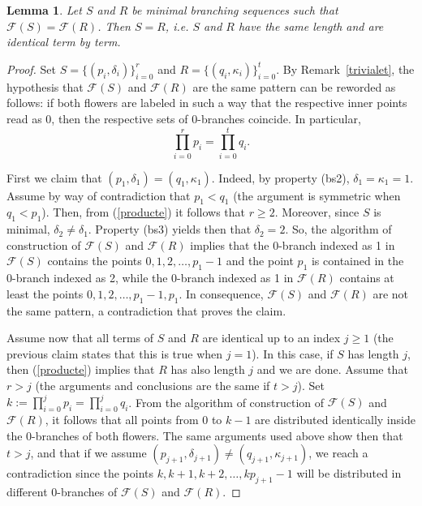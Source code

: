\documentclass[a4paper]{amsart}
\newtheorem{lemma}[theorem]{Lemma}
\theoremstyle{definition}
\begin{document}
\begin{lemma}\label{bra0}
Let $S$ and $R$ be minimal branching sequences such that $\mathcal{F}(S)=\mathcal{F}(R)$. Then $S=R$, i.e. $S$ and $R$ have the same length and are identical term by term.
\end{lemma}
\begin{proof}
Set $S=\{(p_i,\delta_i)\}_{i=0}^r$ and $R=\{(q_i,\kappa_i)\}_{i=0}^{t}$. By Remark~\ref{trivialet}, the hypothesis that $\mathcal{F}(S)$ and $\mathcal{F}(R)$ are the same pattern can be reworded as follows: if both flowers are labeled in such a way that the respective inner points read as 0, then the respective sets of 0-branches coincide. In particular,
\begin{equation}\label{producte}
\prod_{i=0}^r p_i=\prod_{i=0}^t q_i.
\end{equation}

First we claim that $(p_1,\delta_1)=(q_1,\kappa_1)$. Indeed, by property (bs2), $\delta_1=\kappa_1=1$. Assume by way of contradiction that $p_1<q_1$ (the argument is symmetric when $q_1<p_1$). Then, from (\ref{producte}) it follows that $r\ge2$. Moreover, since $S$ is minimal,  $\delta_2\ne\delta_1$. Property (bs3) yields then that $\delta_2=2$. So, the algorithm of construction of $\mathcal{F}(S)$ and $\mathcal{F}(R)$ implies that the 0-branch indexed as 1 in $\mathcal{F}(S)$ contains the points $0,1,2,\ldots,p_1-1$ and the point $p_1$ is contained in the 0-branch  indexed as 2, while the 0-branch indexed as 1 in $\mathcal{F}(R)$ contains at least the points $0,1,2,\ldots,p_1-1,p_1$. In consequence, $\mathcal{F}(S)$ and $\mathcal{F}(R)$ are not the same pattern, a contradiction that proves the claim.

Assume now that all terms of $S$ and $R$ are identical up to an index $j\ge 1$ (the previous claim states that this is true when $j=1$). In this case, if $S$ has length $j$, then (\ref{producte}) implies that $R$ has also length $j$ and we are done. Assume that $r>j$ (the arguments and conclusions are the same if $t>j$). Set $k:=\prod_{i=0}^j p_i=\prod_{i=0}^j q_i$. From the algorithm of construction of $\mathcal{F}(S)$ and $\mathcal{F}(R)$, it follows that all points from 0 to $k-1$ are distributed identically inside the 0-branches of both flowers. The same arguments used above show then that $t>j$, and that if we assume $(p_{j+1},\delta_{j+1})\ne(q_{j+1},\kappa_{j+1})$, we reach a contradiction since the points $k,k+1,k+2,\ldots,kp_{j+1}-1$ will be distributed in different 0-branches of $\mathcal{F}(S)$ and $\mathcal{F}(R)$.
\end{proof}
\end{document}
